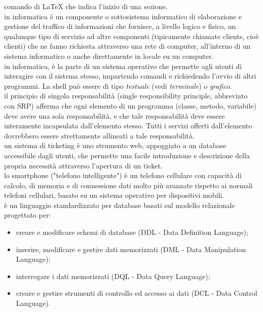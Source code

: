 \documentclass{scalatekids-article}
\begin{document}
   comando di \LaTeX\xspace che indica l'inizio di una sezione.
  \\
  
   in informatica è un componente o sottosistema informatico di elaborazione e gestione del traffico di informazioni che fornisce, a livello logico e fisico, un qualunque tipo di servizio ad altre componenti (tipicamente chiamate clients, cioè clienti) che ne fanno richiesta attraverso una rete di computer, all'interno di un sistema informatico o anche direttamente in locale su un computer.
  \\
  
   in informatica, è la parte di un sistema operativo che permette agli utenti di interagire con il sistema stesso, impartendo comandi e richiedendo l'avvio di altri programmi.
  La shell può essere di tipo \textit{testuale} (vedi \textit{terminale}) o \textit{grafico}.
  \\

   il principio di singola responsabilità (single responsibility principle, abbreviato con SRP) afferma che ogni elemento di un programma (classe, metodo, variabile) deve avere una sola responsabilità, e che tale responsabilità deve essere interamente incapsulata dall'elemento stesso. Tutti i servizi offerti dall'elemento dovrebbero essere strettamente allineati a tale responsabilità.
  \\

   un sistema di ticketing è uno strumento web, appoggiato a un database accessibile dagli utenti, che permette una facile introduzione e descrizione della propria necessità attraverso l’apertura di un ticket.
  \\

   lo smartphone ("telefono intelligente") è un telefono cellulare con capacità di calcolo, di memoria e di connessione dati molto più avanzate rispetto ai normali telefoni cellulari, basato su un sistema operativo per dispositivi mobili.
  \\

   è un linguaggio standardizzato per database basati sul modello relazionale progettato per:
  \begin{itemize}
  	\item creare e modificare schemi di database (DDL - Data Definition Language);
  	\item inserire, modificare e gestire dati memorizzati (DML - Data Manipulation Language);
  	\item interrogare i dati memorizzati (DQL - Data Query Language);
  	\item creare e gestire strumenti di controllo ed accesso ai dati (DCL - Data Control Language).
  \end{itemize}
\end{document}
